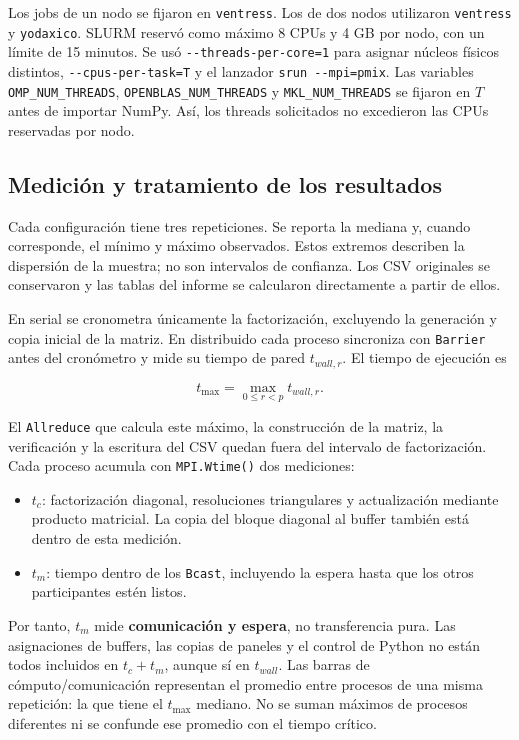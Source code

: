 \documentclass[
  spanish,
  11pt,
  a4paper,
]{article}
\providecommand{\tightlist}{%
  \setlength{\itemsep}{0pt}\setlength{\parskip}{0pt}}
\begin{document}
Los jobs de un nodo se fijaron en \texttt{ventress}. Los de dos nodos
utilizaron \texttt{ventress} y \texttt{yodaxico}. SLURM reservó como
máximo 8 CPUs y 4 GB por nodo, con un límite de 15 minutos. Se usó
\texttt{-\/-threads-per-core=1} para asignar núcleos físicos distintos,
\texttt{-\/-cpus-per-task=T} y el lanzador \texttt{srun\ -\/-mpi=pmix}.
Las variables \texttt{OMP\_NUM\_THREADS},
\texttt{OPENBLAS\_NUM\_THREADS} y \texttt{MKL\_NUM\_THREADS} se fijaron
en \(T\) antes de importar NumPy. Así, los threads solicitados no
excedieron las CPUs reservadas por nodo.

\subsection{Medición y tratamiento de los
resultados}\label{mediciuxf3n-y-tratamiento-de-los-resultados}

Cada configuración tiene tres repeticiones. Se reporta la mediana y,
cuando corresponde, el mínimo y máximo observados. Estos extremos
describen la dispersión de la muestra; no son intervalos de confianza.
Los CSV originales se conservaron y las tablas del informe se calcularon
directamente a partir de ellos.

En serial se cronometra únicamente la factorización, excluyendo la
generación y copia inicial de la matriz. En distribuido cada proceso
sincroniza con \texttt{Barrier} antes del cronómetro y mide su tiempo de
pared \(t_{wall,r}\). El tiempo de ejecución es

\[t_{\max}=\max_{0\le r<p}t_{wall,r}.\]

El \texttt{Allreduce} que calcula este máximo, la construcción de la
matriz, la verificación y la escritura del CSV quedan fuera del
intervalo de factorización. Cada proceso acumula con
\texttt{MPI.Wtime()} dos mediciones:

\begin{itemize}
\tightlist
\item
  \(t_c\): factorización diagonal, resoluciones triangulares y
  actualización mediante producto matricial. La copia del bloque
  diagonal al buffer también está dentro de esta medición.
\item
  \(t_m\): tiempo dentro de los \texttt{Bcast}, incluyendo la espera
  hasta que los otros participantes estén listos.
\end{itemize}

Por tanto, \(t_m\) mide \textbf{comunicación y espera}, no transferencia
pura. Las asignaciones de buffers, las copias de paneles y el control de
Python no están todos incluidos en \(t_c+t_m\), aunque sí en
\(t_{wall}\). Las barras de cómputo/comunicación representan el promedio
entre procesos de una misma repetición: la que tiene el \(t_{\max}\)
mediano. No se suman máximos de procesos diferentes ni se confunde ese
promedio con el tiempo crítico.
\end{document}
